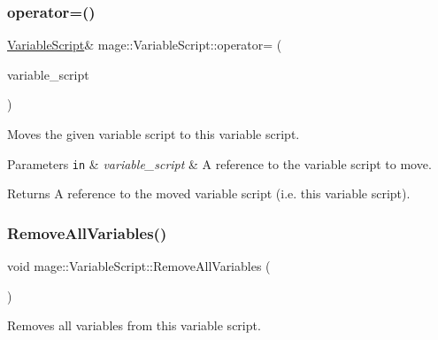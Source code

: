\subsubsection{\texorpdfstring{operator=()}{operator=()}\hspace{0.1cm}{\footnotesize\ttfamily [2/2]}}
{\footnotesize\ttfamily \hyperlink{classmage_1_1_variable_script}{Variable\+Script}\& mage\+::\+Variable\+Script\+::operator= (\begin{DoxyParamCaption}\item[{\hyperlink{classmage_1_1_variable_script}{Variable\+Script} \&\&}]{variable\+\_\+script }\end{DoxyParamCaption})\hspace{0.3cm}{\ttfamily [delete]}}

Moves the given variable script to this variable script.


\begin{DoxyParams}[1]{Parameters}
\mbox{\tt in}  & {\em variable\+\_\+script} & A reference to the variable script to move. \\
\hline
\end{DoxyParams}
\begin{DoxyReturn}{Returns}
A reference to the moved variable script (i.\+e. this variable script). 
\end{DoxyReturn}
\hypertarget{classmage_1_1_variable_script_ac9575fb5f2ca445d9bcf23b63d00124e}{}\label{classmage_1_1_variable_script_ac9575fb5f2ca445d9bcf23b63d00124e} 
\subsubsection{\texorpdfstring{Remove\+All\+Variables()}{RemoveAllVariables()}}
{\footnotesize\ttfamily void mage\+::\+Variable\+Script\+::\+Remove\+All\+Variables (\begin{DoxyParamCaption}{ }\end{DoxyParamCaption})}

Removes all variables from this variable script. \hypertarget{classmage_1_1_variable_script_a4970ef4faafb1a6a43c4648ec9f36cce}{}\label{classmage_1_1_variable_script_a4970ef4faafb1a6a43c4648ec9f36cce} 

